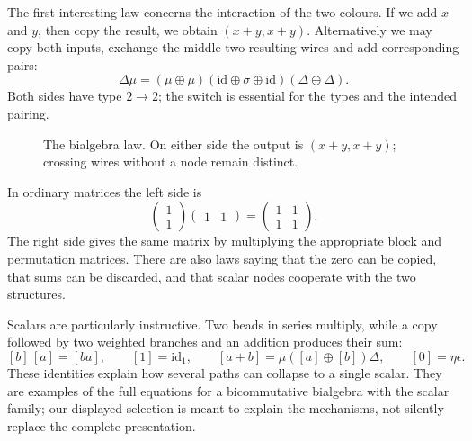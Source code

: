 The first interesting law concerns the interaction of the two colours. If we add \(x\) and \(y\), then copy the result, we obtain \((x+y,x+y)\). Alternatively we may copy both inputs, exchange the middle two resulting wires and add corresponding pairs:
\[
 \boxed{
 \Delta\mu
 =(\mu\oplus\mu)
   (\mathrm{id}\oplus\sigma\oplus\mathrm{id})
   (\Delta\oplus\Delta).
 }
\]
Both sides have type \(2\to2\); the switch is essential for the types and the intended pairing.

\begin{figure}[H]
\centering
{}
\caption{The bialgebra law. On either side the output is \((x+y,x+y)\); crossing wires without a node remain distinct.}
\end{figure}

In ordinary matrices the left side is
\[
 \begin{pmatrix}1\\1\end{pmatrix}
 \begin{pmatrix}1&1\end{pmatrix}
 =\begin{pmatrix}1&1\\1&1\end{pmatrix}.
\]
The right side gives the same matrix by multiplying the appropriate block and permutation matrices. There are also laws saying that the zero can be copied, that sums can be discarded, and that scalar nodes cooperate with the two structures.

Scalars are particularly instructive. Two beads in series multiply, while a copy followed by two weighted branches and an addition produces their sum:
\[
 [b]\,[a]=[ba],\qquad [1]=\mathrm{id}_1,\qquad
 \boxed{[a+b]=\mu([a]\oplus[b])\Delta},\qquad
 [0]=\eta\epsilon.
\]
These identities explain how several paths can collapse to a single scalar. They are examples of the full equations for a bicommutative bialgebra with the scalar family; our displayed selection is meant to explain the mechanisms, not silently replace the complete presentation.

